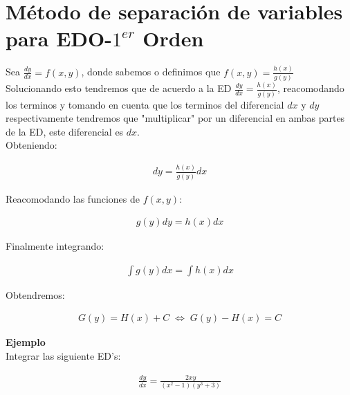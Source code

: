 \chapter{Método de separación de variables para EDO-\(\displaystyle 1^{er}\) Orden}
Sea \(\displaystyle\frac{dy}{dx}=f(x,y)\), donde sabemos o definimos que \(\displaystyle f(x,y)=\frac{h(x)}{g(y)}\)\\

Solucionando esto tendremos que de acuerdo a la ED \(\displaystyle\frac{dy}{dx}=\frac{h(x)}{g(y)}\), reacomodando los terminos y tomando en cuenta que los terminos del diferencial \(\displaystyle dx\) y \(\displaystyle dy\) respectivamente tendremos que "multiplicar" por un diferencial en ambas partes de la ED, este diferencial es \(\displaystyle dx\).\\

Obteniendo:

\begin{equation*}
    \begin{gathered}
        dy=\frac{h(x)}{g(y)}dx
    \end{gathered}
\end{equation*}

Reacomodando las funciones de \(\displaystyle f(x,y)\):

\begin{equation*}
    \begin{gathered}
        g(y)dy=h(x)dx
    \end{gathered}
\end{equation*}

Finalmente integrando:

\begin{equation*}
    \begin{gathered}
        \int g(y)dx=\int h(x)dx
    \end{gathered}
\end{equation*}

Obtendremos:

\begin{equation*}
    \begin{gathered}
        G(y)=H(x)+C \;\Leftrightarrow\; G(y)-H(x)=C
    \end{gathered}
\end{equation*}

\textbf{Ejemplo}\\

Integrar las siguiente ED's:

\begin{equation}
    \begin{gathered}
        \frac{dy}{dx}=\frac{2xy}{(x^{2}-1)(y^{3}+3)}
    \end{gathered}
\end{equation}

